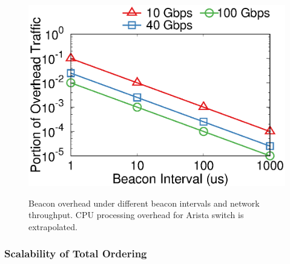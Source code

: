 \begin{figure}[t]
\begin{minipage}[t]{.32\textwidth}
		{\includegraphics[width=\textwidth]{gnuplot/beacon_network_overhead.eps}}
		\newline
		\caption{
			Beacon overhead under different beacon intervals and network throughput.
			CPU processing overhead for Arista switch is extrapolated.
		}
		\label{fig:overhead}
	\end{minipage}
\end{figure}

\subsubsection{Scalability of Total Ordering}

